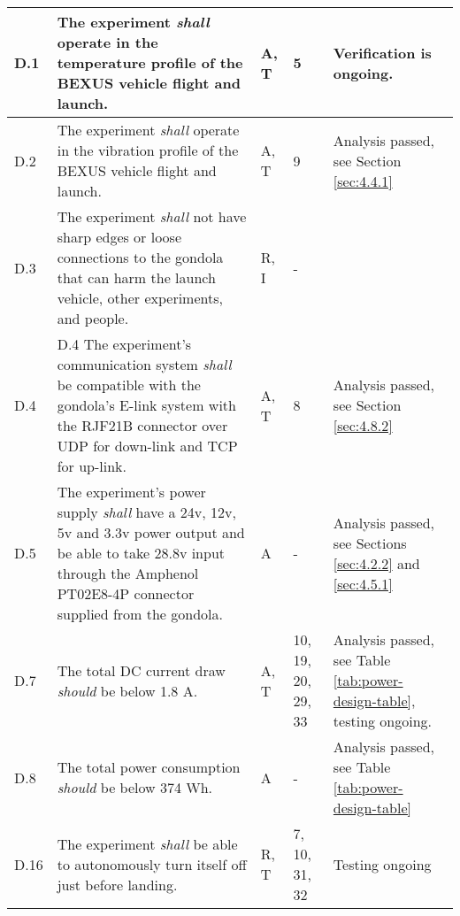 \begin{longtable}[]{|m{}| m{} |m{} |m{}|m{}|}
D.1  & The experiment \textit{shall} operate in the temperature profile of the BEXUS vehicle flight and launch.\cite{BexusManual}                                                                         &       A, T       & 5            & Verification is ongoing.     \\ \hline
D.2  & The experiment \textit{shall} operate in the vibration profile of the BEXUS vehicle flight and launch.\cite{BexusManual}                                                                          &       A, T       & 9            &  Analysis passed, see Section \ref{sec:4.4.1}       \\ \hline
D.3  & The experiment \textit{shall} not have sharp edges or loose connections to the gondola that can harm the launch vehicle, other experiments, and people.                                                                                                           &      R, I      & -          &        \\ \hline %
D.4  & 
    \item[D.4] The experiment's communication system \textit{shall} be compatible with the gondola's E-link system with the RJF21B connector over UDP for down-link and TCP for up-link.                                                                             &      A, T        & 8            &    Analysis passed, see Section \ref{sec:4.8.2}    \\ \hline
D.5  & The experiment's power supply \textit{shall} have a 24v, 12v, 5v and 3.3v power output and be able to take 28.8v input through the Amphenol PT02E8-4P connector supplied from the gondola.                                                                                    &      A       &  -           & Analysis passed, see Sections \ref{sec:4.2.2} and \ref{sec:4.5.1}      \\ \hline
D.7  & The total DC current draw \textit{should} be below 1.8 A. &      A, T        & 10, 19, 20, 29, 33            & Analysis passed, see Table \ref{tab:power-design-table}, testing ongoing.        \\ \hline
D.8  & The total power consumption \textit{should} be below 374 Wh.& A & - & Analysis passed, see Table \ref{tab:power-design-table} \\ \hline
D.16 & The experiment \textit{shall} be able to autonomously turn itself off just before landing.                                                                                       &       R, T      &  7, 10, 31, 32           &   Testing ongoing    \\ \hline

\end{longtable}
